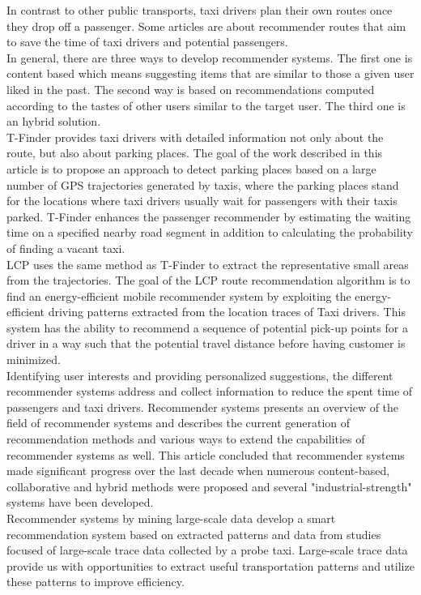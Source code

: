 \documentclass[11pt,conference,a4paper,twocolumns,romanappendices]{IEEEtran}
\begin{document}
In contrast to other public transports, taxi drivers plan their own routes once they drop off a passenger. Some articles are about recommender routes that aim to save the time of taxi drivers and potential passengers. \\
In general, there are three ways to develop recommender systems. The first one is content based which means suggesting items that are similar to those a given user liked in the past. The second way is based on recommendations computed according to the tastes of other users similar to the target user. The third one is an hybrid solution. \\
T-Finder provides taxi drivers with detailed information not only about the route, but also about parking places. \cite{tf} The goal of the work described in this article is to propose an approach to detect parking places based on a large number of GPS trajectories generated by taxis, where the parking places stand for the locations where taxi drivers usually wait for passengers with their taxis parked. T-Finder enhances the passenger recommender by estimating the waiting time on a specified nearby road segment in addition to calculating the probability of finding a vacant taxi. \\
LCP \cite{eff} uses the same method as T-Finder \cite{tf} to extract the representative small areas from the trajectories. The goal of the LCP route recommendation algorithm is to find an energy-efficient mobile recommender system by exploiting the energy-efficient driving patterns extracted from the location traces of Taxi drivers. This system has the ability to recommend a sequence of potential pick-up points for a driver in a way such that the potential travel distance before having customer is minimized. \\
Identifying user interests and providing personalized suggestions, the different recommender systems address and collect information to reduce the spent time of passengers and taxi drivers. Recommender systems \cite{tow} presents an overview of the field of recommender systems and describes the current generation of recommendation methods and various ways to extend the capabilities of recommender systems as well. This article concluded that recommender systems made significant progress over the last decade when numerous content-based, collaborative and hybrid methods were proposed and several "industrial-strength" systems have been developed. \\
Recommender systems by mining large-scale \cite{min1,min2} data develop a smart recommendation system based on extracted patterns and data from studies focused of large-scale trace data collected by a probe taxi. Large-scale trace data provide us with opportunities to extract useful transportation patterns and utilize these patterns to improve efficiency.
\end{document}
